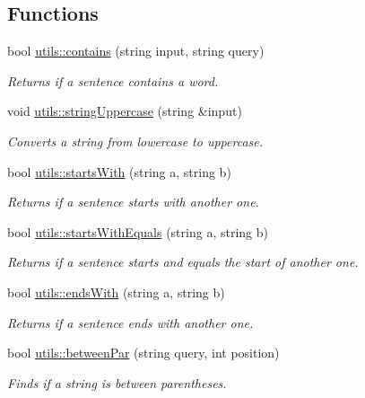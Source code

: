 \subsection*{Functions}
\begin{DoxyCompactItemize}
\item 
bool \hyperlink{namespaceutils_a69c832543a093a8099189e4755695a62}{utils\+::contains} (string input, string query)
\begin{DoxyCompactList}\small\item\em Returns if a sentence contains a word. \end{DoxyCompactList}\item 
void \hyperlink{namespaceutils_a4cc31521e740c9e31b4bfa8ee85eff46}{utils\+::string\+Uppercase} (string \&input)
\begin{DoxyCompactList}\small\item\em Converts a string from lowercase to uppercase. \end{DoxyCompactList}\item 
bool \hyperlink{namespaceutils_ae840ea1b4ad4ce23c2b48158ac75d557}{utils\+::starts\+With} (string a, string b)
\begin{DoxyCompactList}\small\item\em Returns if a sentence starts with another one. \end{DoxyCompactList}\item 
bool \hyperlink{namespaceutils_ac8cc8683906877c69cfea7cb2812ed07}{utils\+::starts\+With\+Equals} (string a, string b)
\begin{DoxyCompactList}\small\item\em Returns if a sentence starts and equals the start of another one. \end{DoxyCompactList}\item 
bool \hyperlink{namespaceutils_a57772e91d08481b38c47cda04479e169}{utils\+::ends\+With} (string a, string b)
\begin{DoxyCompactList}\small\item\em Returns if a sentence ends with another one. \end{DoxyCompactList}\item 
bool \hyperlink{namespaceutils_a1e1de2e5772bffdfe2c8d3309a61ddab}{utils\+::between\+Par} (string query, int position)
\begin{DoxyCompactList}\small\item\em Finds if a string is between parentheses. \end{DoxyCompactList}\item 

\end{DoxyCompactItemize}
